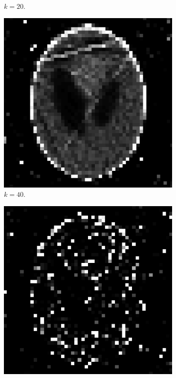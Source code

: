 \documentclass[letterpaper,12pt]{article}
\theoremstyle{plain}
\begin{document}
\begin{figure}[H]
\begin{subfigure}[h]{0.32\linewidth}
         \caption{$k=20$.}
         \label{fig:k20}
      \end{subfigure}
        \begin{subfigure}[h]{0.32\linewidth}
         \centering
         \includegraphics[width=\textwidth]{Figuras/em_k=40.png}
         \caption{$k=40$.}
         \label{fig:k40}
        \end{subfigure}
        \begin{subfigure}[h]{0.32\linewidth}
         \centering
         \includegraphics[width=\textwidth]{Figuras/em_k=50.png}

\end{subfigure}
\end{figure}
\end{document}

